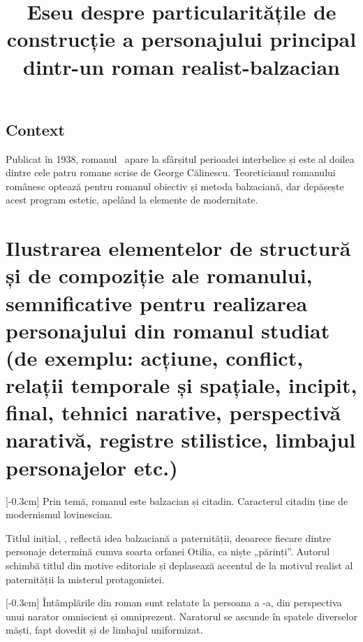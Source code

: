 

\newcommand{\operatitle}{\textbfit{„Enigma Otiliei”}} %
\newcommand{\operaauthor}{George Călinescu} %

\title{Eseu despre particularitățile de construcție a personajului principal dintr-un roman realist-balzacian}



\maketitle %



\subsection{Context}

Publicat în 1938, romanul \operatitle\ apare la sfârșitul perioadei interbelice și este al doilea dintre cele patru romane scrise de \operaauthor. Teoreticianul romanului românesc optează pentru romanul obiectiv și metoda balzaciană, dar depășește acest program estetic, apelând la elemente de modernitate.


\section{Ilustrarea elementelor de structură și de compoziție ale romanului, semnificative pentru realizarea personajului din romanul studiat {\footnotesize\normalfont(de exemplu: acțiune, conflict, relații temporale și spațiale, incipit, final, tehnici narative, perspectivă narativă, registre stilistice, limbajul personajelor etc.)}}

[-0.3cm]
Prin temă, romanul este balzacian și citadin. Caracterul citadin ține de modernismul lovinescian.

Titlul inițial, , reflectă idea balzaciană a paternității, deoarece fiecare dintre personaje determină cumva soarta orfanei Otilia, ca niște „părinți”. Autorul schimbă titlul din motive editoriale și deplasează accentul de la motivul realist al paternității la misterul protagonistei.

[-0.3cm]
Întâmplările din roman sunt relatate la persoana a -a, din perspectiva unui narator omniscient și omniprezent. Naratorul se ascunde în spatele diverselor măști, fapt dovedit și de limbajul uniformizat.

